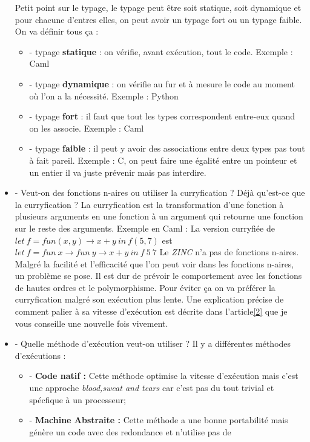 \documentclass[10pt,a4paper]{report}
\begin{document}
\begin{itemize}
  Petit point sur le typage, le typage peut être soit statique, soit dynamique et pour chacune d'entres elles, on peut avoir un typage
  fort ou un typage faible. On va définir tous ça :
  \begin{itemize}
  \item[] - typage \textbf{statique} : on vérifie, avant exécution, tout le code. Exemple : Caml
  \item[] - typage \textbf{dynamique} : on vérifie au fur et à mesure le code au moment où l'on a la nécessité. Exemple : Python
  \item[] - typage \textbf{fort} : il faut que tout les types correspondent entre-eux quand on les associe. Exemple : Caml 
  \item[] - typage \textbf{faible} : il peut y avoir des associations entre deux types pas tout à fait pareil. Exemple : C, on peut
    faire une égalité entre un pointeur et un entier il va juste prévenir mais pas interdire. 
  \end{itemize} 
\item[] - Veut-on des fonctions n-aires ou utiliser la curryfication ? Déjà qu'est-ce que la curryfication ? La curryfication est la
  transformation d'une fonction à plusieurs arguments en une fonction à un argument qui retourne une fonction sur le reste des arguments.
  \smallbreak
  Exemple en Caml : La version curryfiée de $let~f = fun(x,y) \rightarrow x+y~in~f(5,7)$ est\\ $let~f = fun~x \rightarrow fun~y \rightarrow x+y~in~f~5~7$ 
  \smallbreak
  Le \textit{ZINC} n'a pas de fonctions n-aires. Malgré la facilité et l'efficacité que l'on peut voir dans les fonctions n-aires, un problème
  se pose. Il est dur de prévoir le comportement avec les fonctions de hautes ordres et le polymorphisme. Pour éviter ça on va préférer la
  curryfication malgré son exécution plus lente. Une explication précise de comment palier à sa vitesse d'exécution est décrite dans
  l'article\hyperref[ZINC]{[2]} que je vous conseille une nouvelle fois vivement.
\item[] - Quelle méthode d'exécution veut-on utiliser ? Il y a différentes méthodes d'exécutions :
  \begin{itemize}
  \item[] - \textbf{Code natif :} Cette méthode optimise la vitesse d'exécution mais c'est une approche \textit{blood,sweat and tears} car
    c'est pas du tout trivial et spécfique à un processeur;
  \item[] - \textbf{Machine Abstraite :} Cette méthode a une bonne portabilité mais génère un code avec des redondance et n'utilise pas de

\end{itemize}
\end{itemize}
\end{document}
